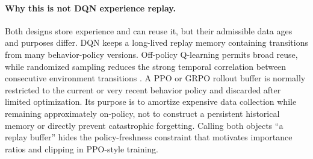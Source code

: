 \paragraph{Why this is not DQN experience replay.}
Both designs store experience and can reuse it, but their admissible data ages and
purposes differ. DQN keeps a long-lived replay memory containing transitions from many
behavior-policy versions. Off-policy Q-learning permits broad reuse, while randomized
sampling reduces the strong temporal correlation between consecutive environment
transitions \citep{mnih2015dqn}. A PPO or GRPO rollout buffer is normally restricted to
the current or very recent behavior policy and discarded after limited optimization. Its
purpose is to amortize expensive data collection while remaining approximately on-policy,
not to construct a persistent historical memory or directly prevent catastrophic
forgetting. Calling both objects ``a replay buffer'' hides the policy-freshness constraint
that motivates importance ratios and clipping in PPO-style training.
